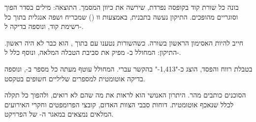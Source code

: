 \begin{riskbox}
 בונה כל שורת קוד בקופסה נפרדת, שירשה את כיוון המסמך. התוצאה: מילים בסדר הפוך וסוגריים מהופכים. התיקון נעשה בתבנית, באמצעות וו () שמכריח  ושפה אנגלית בתוך כל רשימת קוד, ונוספה בדיקה ל-.
\end{riskbox}

\begin{riskbox}
 חייב להיות האסימון הראשון בשורה. כשהשורות נטענו עם  בתוך , הוא כבר לא היה ראשון. התיקון: המחולל ב- מפיק את סביבת הטבלה המלאה, ונוסף כלל ל-.
\end{riskbox}

\begin{riskbox}
בטבלת רווח והפסד,  הוצג כ-"1,413-" בהקשר עברי. המחולל עוטף מעתה כל מספר ב-, ונוספה בדיקה אוטומטית למספרים שליליים חשופים בטקסט.
\end{riskbox}

\begin{insightbox}
הסוכנים כותבים מהר. היתרון האנושי הוא לראות את מה שהם לא רואים, ולהפוך כל תקלה לכלל שנאכף אוטומטית. דוחות סבבי הצוות האדום, קובצי הפרומפטים וחקרי האירועים המלאים נמצאים במאגר ה- של הפרויקט.
\end{insightbox}

